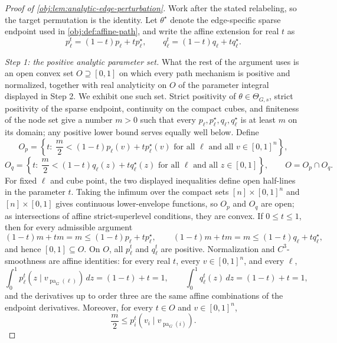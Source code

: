 \documentclass[11pt]{article}
\begin{document}
\begin{proof}[Proof of \cref{obj:lem:analytic-edge-perturbation}]
Work after the stated relabeling, so the target permutation is the identity.  Let
\(\theta^\star\) denote the edge-specific sparse endpoint used in
\cref{obj:def:affine-path}, and write the affine extension for real \(t\) as
\[
p_\ell^t=(1-t)p_\ell+t p_\ell^\star,\qquad
q_\ell^t=(1-t)q_\ell+t q_\ell^\star .
\]

\emph{Step 1: the positive analytic parameter set.}
What the rest of the argument uses is an open convex set \(O\supseteq[0,1]\) on which every path mechanism is positive and normalized, together with real analyticity on \(O\) of the parameter integral displayed in Step 2.  We exhibit one such set.  Strict positivity of \(\theta\in\Theta_{G,s}\), strict positivity of the sparse endpoint, continuity on the compact cubes, and finiteness of the node set give a number \(m>0\) such that every \(p_\ell,p_\ell^\star,q_\ell,q_\ell^\star\) is at least \(m\) on its domain; any positive lower bound serves equally well below.  Define
\[
O_p=\left\{t:\ \frac m2<(1-t)p_\ell(v)+t p_\ell^\star(v)
\text{ for all }\ell\text{ and all }v\in[0,1]^n\right\},
\]
\[
O_q=\left\{t:\ \frac m2<(1-t)q_\ell(z)+t q_\ell^\star(z)
\text{ for all }\ell\text{ and all }z\in[0,1]\right\},
\qquad O=O_p\cap O_q .
\]
For fixed \(\ell\) and cube point, the two displayed inequalities define open half-lines in the parameter \(t\).  Taking the infimum over the compact sets \([n]\times[0,1]^n\) and \([n]\times[0,1]\) gives continuous lower-envelope functions, so \(O_p\) and \(O_q\) are open; as intersections of affine strict-superlevel conditions, they are convex.  If \(0\le t\le1\), then for every admissible argument
\[
(1-t)m+tm=m
\le (1-t)p_\ell+t p_\ell^\star,
\qquad
(1-t)m+tm=m
\le (1-t)q_\ell+t q_\ell^\star,
\]
and hence \([0,1]\subseteq O\).  On \(O\), all \(p_\ell^t\) and \(q_\ell^t\) are positive.  Normalization and \(C^3\)-smoothness are affine identities: for every real \(t\), every \(v\in[0,1]^n\), and every \(\ell\),
\[
\int_0^1 p_\ell^t(z\mid v_{\operatorname{pa}_G(\ell)})\,dz
=(1-t)+t=1,\qquad
\int_0^1 q_\ell^t(z)\,dz=(1-t)+t=1,
\]
and the derivatives up to order three are the same affine combinations of the endpoint derivatives.  Moreover, for every \(t\in O\) and \(v\in[0,1]^n\),
\[
\frac m2\le p_i^t(v_i\mid v_{\operatorname{pa}_G(i)}).
\]


\end{proof}
\end{document}
